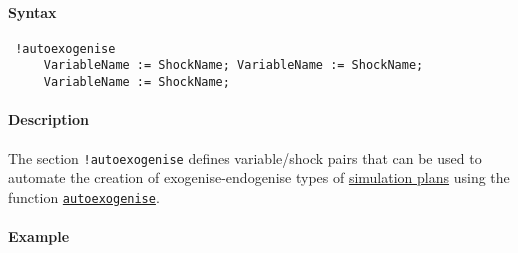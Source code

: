 


	\paragraph{Syntax}
 
 \begin{verbatim}
 !autoexogenise
     VariableName := ShockName; VariableName := ShockName;
     VariableName := ShockName;
 \end{verbatim}
 
 \paragraph{Description}
 
 The section \texttt{!autoexogenise} defines variable/shock pairs that
 can be used to automate the creation of exogenise-endogenise types of
 \href{plan/Contents}{simulation plans} using the function
 \href{plan/autoexogenise}{\texttt{autoexogenise}}.
 
 \paragraph{Example}


